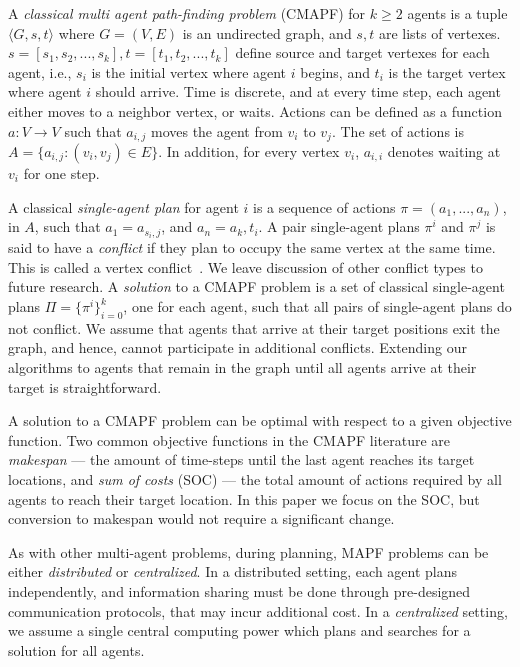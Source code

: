 \documentclass[letterpaper]{article} %
\begin{document}
A \emph{classical multi agent path-finding problem} (CMAPF) \cite[e.g.][]{stern2019multi} for $k \geq 2$ agents is a tuple $\langle G,s,t \rangle$
where $G = (V, E)$ is an undirected graph, and $s,t$ are lists of vertexes. $s = [s_1, s_2, ..., s_k], t = [t_1, t_2, ..., t_k]$ define source and target vertexes for each agent, i.e., $s_i$ is the initial vertex where agent $i$ begins, and $t_i$ is the target vertex where agent $i$ should arrive.  
Time is discrete, and at every time step, each
agent either moves to a neighbor vertex, or waits. Actions can be defined as a function $a : V \rightarrow V$ such that $a_{i,j}$ moves the agent from $v_i$ to $v_j$. The set of actions is $A=\{a_{i,j}:(v_i, v_j) \in E\}$. In addition, for every vertex $v_i$, $a_{i,i}$ denotes waiting at $v_i$ for one step.

A classical \emph{single-agent plan} for agent $i$ is a sequence of actions $\pi = (a_1, . . ., a_n)$, in $A$, such that $a_1=a_{s_i,j}$, and $a_n=a_k,t_i$. 
A pair single-agent plans $\pi^i$ and $\pi^j$ is said to have a \emph{conflict} if they plan to occupy the same vertex at the same time. This is called a vertex conflict~\cite{stern2019multi}. We leave discussion of other conflict types to future research.
A \emph{solution} to a CMAPF problem is a set of classical single-agent plans $\Pi = \{ \pi^i \}_{i=0}^k $, one for each agent, such that all pairs of single-agent plans do not conflict.  
We assume that agents that arrive at their target positions exit the graph, and hence, cannot participate in additional conflicts. Extending our algorithms to agents that remain in the graph until all agents arrive at their target is straightforward.


  
A solution to a CMAPF problem can be optimal with respect to a given objective function.
Two common objective functions in the CMAPF literature are \emph{makespan} --- the amount of time-steps until
the last agent reaches its target locations, and \emph{sum of costs} (SOC) --- the total amount of actions required by all agents to reach their target location. In this paper we focus on the SOC, but conversion to makespan would not require a significant change. 

As with other multi-agent problems, during planning, MAPF problems can be either \emph{distributed} or \emph{centralized}. In a distributed setting, each agent plans independently, and information sharing must be done through pre-designed communication protocols, that may incur additional cost. In a \emph{centralized} setting, we assume a single central computing power which plans and searches for a solution for all agents. 
\end{document}

